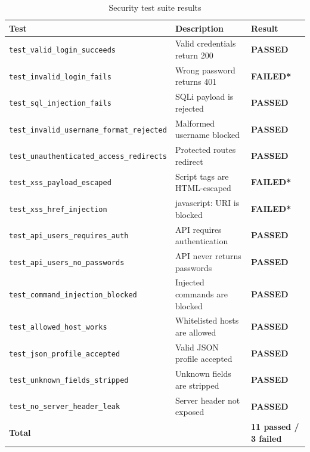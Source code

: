 \documentclass[12pt,a4paper]{report}
\begin{document}
\begin{table}[H]
\centering
\begin{tabularx}{\textwidth}{l l X}
\toprule
\textbf{Test} & \textbf{Description} & \textbf{Result} \\
\midrule
\texttt{test\_valid\_login\_succeeds} & Valid credentials return 200 & \textcolor{codegreen}{\textbf{PASSED}} \\
\texttt{test\_invalid\_login\_fails} & Wrong password returns 401 & \textcolor{accentred}{\textbf{FAILED*}} \\
\texttt{test\_sql\_injection\_fails} & SQLi payload is rejected & \textcolor{codegreen}{\textbf{PASSED}} \\
\texttt{test\_invalid\_username\_format\_rejected} & Malformed username blocked & \textcolor{codegreen}{\textbf{PASSED}} \\
\texttt{test\_unauthenticated\_access\_redirects} & Protected routes redirect & \textcolor{codegreen}{\textbf{PASSED}} \\
\texttt{test\_xss\_payload\_escaped} & Script tags are HTML-escaped & \textcolor{accentred}{\textbf{FAILED*}} \\
\texttt{test\_xss\_href\_injection} & javascript: URI is blocked & \textcolor{accentred}{\textbf{FAILED*}} \\
\texttt{test\_api\_users\_requires\_auth} & API requires authentication & \textcolor{codegreen}{\textbf{PASSED}} \\
\texttt{test\_api\_users\_no\_passwords} & API never returns passwords & \textcolor{codegreen}{\textbf{PASSED}} \\
\texttt{test\_command\_injection\_blocked} & Injected commands are blocked & \textcolor{codegreen}{\textbf{PASSED}} \\
\texttt{test\_allowed\_host\_works} & Whitelisted hosts are allowed & \textcolor{codegreen}{\textbf{PASSED}} \\
\texttt{test\_json\_profile\_accepted} & Valid JSON profile accepted & \textcolor{codegreen}{\textbf{PASSED}} \\
\texttt{test\_unknown\_fields\_stripped} & Unknown fields are stripped & \textcolor{codegreen}{\textbf{PASSED}} \\
\texttt{test\_no\_server\_header\_leak} & Server header not exposed & \textcolor{codegreen}{\textbf{PASSED}} \\
\midrule
\textbf{Total} & & \textbf{11 passed / 3 failed} \\
\bottomrule
\end{tabularx}
\caption{Security test suite results}
\end{table}
\end{document}
